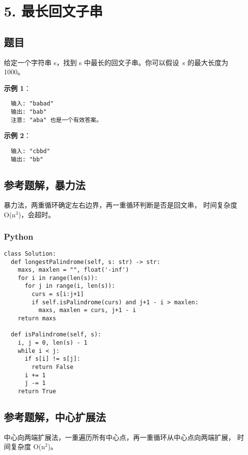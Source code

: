 \newpage
\section{5. 最长回文子串}
\label{leetcode:5}

\subsection{题目}

给定一个字符串 s，找到 s 中最长的回文子串。你可以假设 s 的最大长度为 1000。

\textbf{示例 1}：

\begin{verbatim}
  输入: "babad"
  输出: "bab"
  注意: "aba" 也是一个有效答案。
\end{verbatim}

\textbf{示例 2}：

\begin{verbatim}
  输入: "cbbd"
  输出: "bb"
\end{verbatim}

\subsection{参考题解，暴力法}

暴力法，两重循环确定左右边界，再一重循环判断是否是回文串，
时间复杂度 O(n$^{3}$)，会超时。

\subsubsection{Python}

\begin{verbatim}
class Solution:
  def longestPalindrome(self, s: str) -> str:
    maxs, maxlen = "", float('-inf')
    for i in range(len(s)):
      for j in range(i, len(s)):
        curs = s[i:j+1]
        if self.isPalindrome(curs) and j+1 - i > maxlen:
          maxs, maxlen = curs, j+1 - i
    return maxs

  def isPalindrome(self, s):
    i, j = 0, len(s) - 1
    while i < j:
      if s[i] != s[j]:
        return False
      i += 1
      j -= 1
    return True
\end{verbatim}

\subsection{参考题解，中心扩展法}

中心向两端扩展法，一重遍历所有中心点，再一重循环从中心点向两端扩展，
时间复杂度 O(n$^{2}$)。

